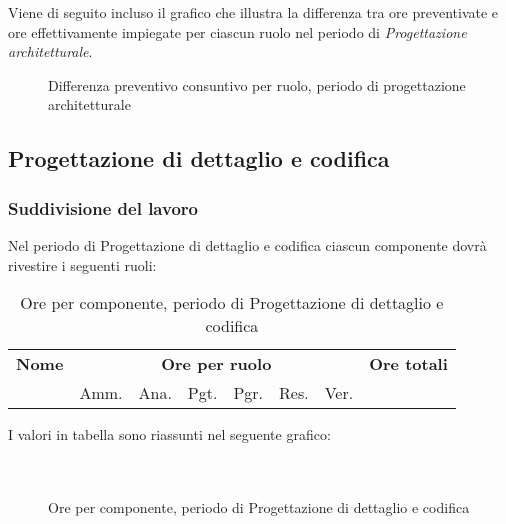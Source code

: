 	Viene di seguito incluso il grafico che illustra la differenza tra ore preventivate e ore effettivamente impiegate per ciascun ruolo nel periodo di \textit{Progettazione architetturale}.

	\begin{figure}[H]
	\centering
	\caption{Differenza preventivo consuntivo per ruolo, periodo di progettazione architetturale}
	\end{figure}


\pagebreak
\subsection{Progettazione di dettaglio e codifica}

	
	\subsubsection{Suddivisione del lavoro}

	Nel periodo di Progettazione di dettaglio e codifica ciascun componente dovrà rivestire i seguenti ruoli:

	\begin{table}[H]
	\centering
	\begin{tabular}{lccccccc}
	\toprule 
	    \textbf{Nome}  & \multicolumn{6}{c}{\textbf{Ore per ruolo}} & \textbf{Ore totali}\\
	     & Amm. & Ana. & Pgt. & Pgr. & Res. & Ver. \\
	    \midrule
	    
	    \bottomrule
	\end{tabular}
	\caption{Ore per componente, periodo di Progettazione di dettaglio e codifica}
	\end{table}

	I valori in tabella sono riassunti nel seguente grafico: \\ \\ \\

	\begin{figure}[H]
	\caption{Ore per componente, periodo di Progettazione di dettaglio e codifica}
	\end{figure}

